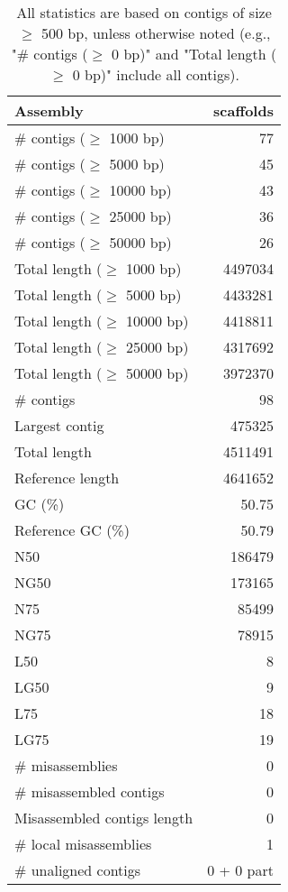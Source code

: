 \documentclass[12pt,a4paper]{article}
\begin{document}
\begin{table}[ht]
\begin{center}
\caption{All statistics are based on contigs of size $\geq$ 500 bp, unless otherwise noted (e.g., "\# contigs ($\geq$ 0 bp)" and "Total length ($\geq$ 0 bp)" include all contigs).}
\begin{tabular}{|l*{1}{|r}|}
\hline
Assembly & scaffolds \\ \hline
\# contigs ($\geq$ 1000 bp) & 77 \\ \hline
\# contigs ($\geq$ 5000 bp) & 45 \\ \hline
\# contigs ($\geq$ 10000 bp) & 43 \\ \hline
\# contigs ($\geq$ 25000 bp) & 36 \\ \hline
\# contigs ($\geq$ 50000 bp) & 26 \\ \hline
Total length ($\geq$ 1000 bp) & 4497034 \\ \hline
Total length ($\geq$ 5000 bp) & 4433281 \\ \hline
Total length ($\geq$ 10000 bp) & 4418811 \\ \hline
Total length ($\geq$ 25000 bp) & 4317692 \\ \hline
Total length ($\geq$ 50000 bp) & 3972370 \\ \hline
\# contigs & 98 \\ \hline
Largest contig & 475325 \\ \hline
Total length & 4511491 \\ \hline
Reference length & 4641652 \\ \hline
GC (\%) & 50.75 \\ \hline
Reference GC (\%) & 50.79 \\ \hline
N50 & 186479 \\ \hline
NG50 & 173165 \\ \hline
N75 & 85499 \\ \hline
NG75 & 78915 \\ \hline
L50 & 8 \\ \hline
LG50 & 9 \\ \hline
L75 & 18 \\ \hline
LG75 & 19 \\ \hline
\# misassemblies & 0 \\ \hline
\# misassembled contigs & 0 \\ \hline
Misassembled contigs length & 0 \\ \hline
\# local misassemblies & 1 \\ \hline
\# unaligned contigs & 0 + 0 part \\ \hline

\end{tabular}
\end{center}
\end{table}
\end{document}
